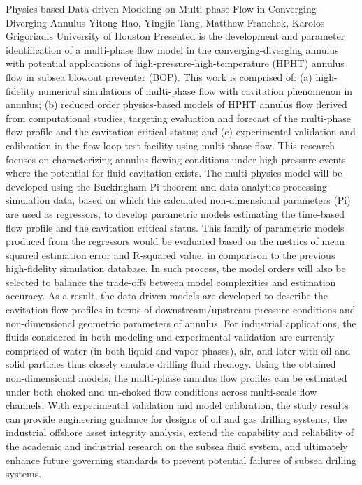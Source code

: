 \begin{addmargin}[2em]{0em}
\vspace{1.5ex}
\abs
{Physics-based Data-driven Modeling on Multi-phase Flow in Converging-Diverging Annulus}
{Yitong Hao, Yingjie Tang, Matthew Franchek, Karolos Grigoriadis}
{University of Houston}
{Presented is the development and parameter identification of a multi-phase flow model in the converging-diverging annulus with potential applications of high-pressure-high-temperature (HPHT) annulus flow in subsea blowout preventer (BOP). This work is comprised of: (a) high-fidelity numerical simulations of multi-phase flow with cavitation phenomenon in annulus; (b) reduced order physics-based models of HPHT annulus flow derived from computational studies, targeting evaluation and forecast of the multi-phase flow profile and the cavitation critical status; and (c) experimental validation and calibration in the flow loop test facility using multi-phase flow. This research focuses on characterizing annulus flowing conditions under high pressure events where the potential for fluid cavitation exists. The multi-physics model will be developed using the Buckingham Pi theorem and data analytics processing simulation data, based on which the calculated non-dimensional parameters (Pi) are used as regressors, to develop parametric models estimating the time-based flow profile and the cavitation critical status. This family of parametric models produced from the regressors would be evaluated based on the metrics of mean squared estimation error and R-squared value, in comparison to the previous high-fidelity simulation database. In such process, the model orders will also be selected to balance the trade-offs between model complexities and estimation accuracy. As a result, the data-driven models are developed to describe the cavitation flow profiles in terms of downstream/upstream pressure conditions and non-dimensional geometric parameters of annulus. For industrial applications, the fluids considered in both modeling and experimental validation are currently comprised of water (in both liquid and vapor phases), air, and later with oil and solid particles thus closely emulate drilling fluid rheology.
Using the obtained non-dimensional models, the multi-phase annulus flow profiles can be estimated under both choked and un-choked flow conditions across multi-scale flow channels. With experimental validation and model calibration, the study results can provide engineering guidance for designs of oil and gas drilling systems, the industrial offshore asset integrity analysis, extend the capability and reliability of the academic and industrial research on the subsea fluid system, and ultimately enhance future governing standards to prevent potential failures of subsea drilling systems.    }



\end{addmargin}
